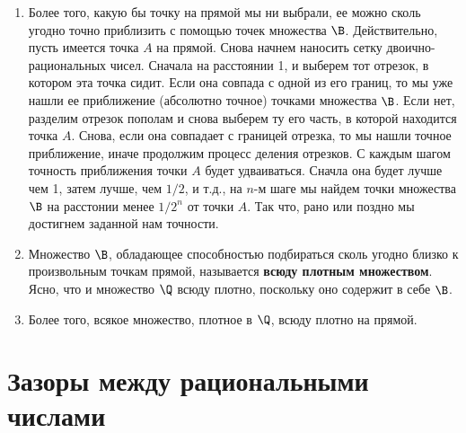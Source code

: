 \begin{enumerate}
\item Более того, какую бы точку на прямой мы ни выбрали, ее можно сколь угодно точно приблизить с помощью точек множества $\B$. Действительно, пусть имеется точка $A$ на прямой. Снова начнем наносить сетку двоично-рациональных чисел. Сначала на расстоянии 1, и выберем тот отрезок, в котором эта точка сидит. Если она совпада с одной из его границ, то мы уже нашли ее приближение (абсолютно точное) точками множества $\B$. Если нет, разделим отрезок пополам и снова выберем ту его часть, в которой находится точка $A$. Снова, если она совпадает с границей отрезка, то мы нашли точное приближение, иначе продолжим процесс деления отрезков. С каждым шагом точность приближения точки $A$ будет удваиваться. Сначла она будет лучше чем 1, затем лучше, чем $1/2$, и т.д., на $n$-м шаге мы найдем точки множества $\B$ на расстонии менее $1/2^n$ от точки $A$. Так что, рано или поздно мы достигнем заданной нам точности.
\item Множество $\B$, обладающее способностью подбираться сколь угодно близко к произвольным точкам прямой, называется \textbf{всюду плотным множеством}. Ясно, что и множество $\Q$ всюду плотно, поскольку оно содержит в себе $\B$.
\item Более того, всякое множество, плотное в $\Q$, всюду плотно на прямой.
\end{enumerate}


\section{Зазоры между рациональными числами}



